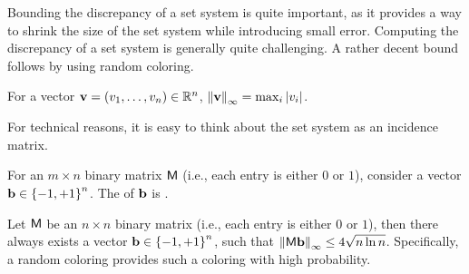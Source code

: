 Bounding the discrepancy of a set system is quite important, as it
provides a way to shrink the size of the set system while introducing
small error. Computing the discrepancy of a set system is generally
quite challenging. A rather decent bound follows by using random
coloring. 

    
\begin{defn}
    For a vector $\mathbf{v} = (v_1,\ldots, v_n) \in \mathbb{R}^n$,
    $\left\| {\mathbf{v}} \right\|_\infty = \max_{i} \left| {v_i} \right|$.
\end{defn}

For technical reasons, it is easy to think about the set
system as an incidence matrix.

\begin{defn}       
    For an $m \times n$ binary matrix $\mathsf{M}$ (i.e., each entry is
    either $0$ or $1$), consider a vector $\mathbf{b} \in \left\{ {-1,
       +1} \right\}^n$. The  of $\mathbf{b}$  is
    \chgY{$\dist{\Matrix \vecb}_\infty$}{$\norm{\Matrix \vecb}_\infty$}.
\end{defn}


\begin{theorem}
    Let $\mathsf{M}$ be an $n \times n$ binary matrix (i.e., each entry
    is either $0$ or $1$), then there always exists a vector
    $\mathbf{b} \in \left\{ {-1, +1} \right\}^n$, such that
    $\left\| {\mathsf{M} \mathbf{b}} \right\|_\infty \leq 4 \sqrt{n \ln n}$.%
    Specifically, a random coloring provides such a coloring
    with high probability.
\end{theorem}

